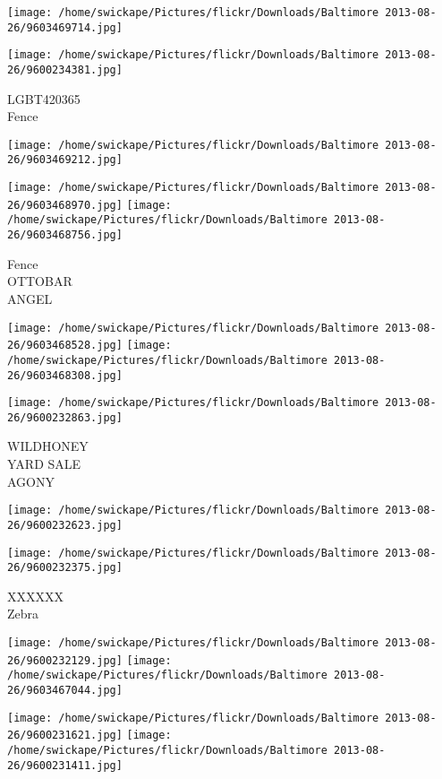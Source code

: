 \documentclass[10pt,letterpaper]{article}
\begin{document}
\texttt{[image: /home/swickape/Pictures/flickr/Downloads/Baltimore 2013-08-26/9603469714.jpg]}

\vspace{0.25in}
\texttt{[image: /home/swickape/Pictures/flickr/Downloads/Baltimore 2013-08-26/9600234381.jpg]}

LGBT420365\\
Fence\\
\pagebreak

\texttt{[image: /home/swickape/Pictures/flickr/Downloads/Baltimore 2013-08-26/9603469212.jpg]}

\vspace{0.25in}
\texttt{[image: /home/swickape/Pictures/flickr/Downloads/Baltimore 2013-08-26/9603468970.jpg]}
\texttt{[image: /home/swickape/Pictures/flickr/Downloads/Baltimore 2013-08-26/9603468756.jpg]}

Fence\\
OTTOBAR\\
ANGEL\\
\pagebreak

\texttt{[image: /home/swickape/Pictures/flickr/Downloads/Baltimore 2013-08-26/9603468528.jpg]}
\texttt{[image: /home/swickape/Pictures/flickr/Downloads/Baltimore 2013-08-26/9603468308.jpg]}

\texttt{[image: /home/swickape/Pictures/flickr/Downloads/Baltimore 2013-08-26/9600232863.jpg]}

WILDHONEY\\
YARD SALE\\
AGONY\\
\pagebreak

\texttt{[image: /home/swickape/Pictures/flickr/Downloads/Baltimore 2013-08-26/9600232623.jpg]}

\vspace{0.25in}
\texttt{[image: /home/swickape/Pictures/flickr/Downloads/Baltimore 2013-08-26/9600232375.jpg]}

XXXXXX\\
Zebra\\
\pagebreak

\texttt{[image: /home/swickape/Pictures/flickr/Downloads/Baltimore 2013-08-26/9600232129.jpg]}
\texttt{[image: /home/swickape/Pictures/flickr/Downloads/Baltimore 2013-08-26/9603467044.jpg]}

\texttt{[image: /home/swickape/Pictures/flickr/Downloads/Baltimore 2013-08-26/9600231621.jpg]}
\texttt{[image: /home/swickape/Pictures/flickr/Downloads/Baltimore 2013-08-26/9600231411.jpg]}
\end{document}
